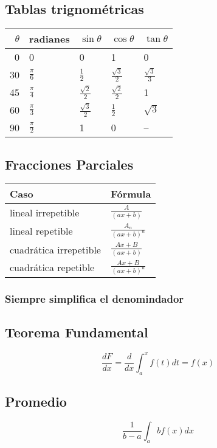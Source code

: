 \documentclass[11pt]{article}
\begin{document}
\subsection{Tablas trignométricas}
\label{sec-2-7}
\begin{center}
\begin{tabular}{rllll}
$\theta$ & radianes & $\sin \theta$ & $\cos \theta$ & $\tan \theta$\\
\hline
0 & 0 & 0 & 1 & 0\\
30 & $\frac{\pi}{6}$ & $\frac{1}{2}$ & $\frac{\sqrt{3}}{2}$ & $\frac{\sqrt{3}}{3}$\\
45 & $\frac{\pi}{4}$ & $\frac{\sqrt{2}}{2}$ & $\frac{\sqrt{2}}{2}$ & 1\\
60 & $\frac{\pi}{3}$ & $\frac{\sqrt{3}}{2}$ & $\frac{1}{2}$ & $\sqrt{3}$\\
90 & $\frac{\pi}{2}$ & 1 & 0 & --\\
\end{tabular}
\end{center}

\subsection{Fracciones Parciales}
\label{sec-2-8}

\begin{center}
\begin{tabular}{ll}
Caso & Fórmula\\
\hline
lineal irrepetible & $\frac{A}{(ax+b)}$\\
lineal repetible & $\frac{A_{n}}{(ax+b)^n}$\\
cuadrática irrepetible & $\frac{Ax + B}{(ax+b)}$\\
cuadrática repetible & $\frac{Ax + B}{(ax+b)^n}$\\
\end{tabular}
\end{center}

\subsubsection{Siempre simplifica el denomindador}
\label{sec-2-8-1}

\subsection{Teorema Fundamental}
\label{sec-2-9}
\[ \frac{dF}{dx} = \frac{d}{dx}\int_{a}^{x}f(t)dt=f(x)\]

\subsection{Promedio}
\label{sec-2-10}
\[\frac{1}{b-a} \int_{a}{b}f(x)dx\]
\end{document}
